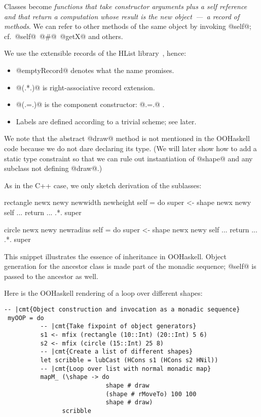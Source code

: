 Classes become \emph{functions that take constructor arguments plus a
self reference and that return a computation whose result is the new
object~---~a record of methods}. We can refer to other methods of the
same object by invoking @self@; cf.\ @self@~@#@~@getX@ and others.

We use the extensible records of the HList library~\cite{HLIST-HW04},
hence:
%
\begin{itemize}\noskip
\item @emptyRecord@ denotes what the name promises.
\item @(.*.)@ is right-associative record extension.
\item @(.=.)@ is the component constructor:  @.=.@ .
\item Labels are defined according to a trivial scheme; see later.
\end{itemize}

We note that the abstract @draw@ method is not mentioned in the
OOHaskell code because we do not dare declaring its type. (We will
later show how to add a static type constraint so that we can rule out
instantiation of @shape@ and any subclass not defining @draw@.)

As in the C++ case, we only sketch derivation of the sublasses:

\begin{code}
 rectangle newx newy newwidth newheight self
  = do  super <- shape newx newy self
        ...
        return ... .*. super
\end{code}

\begin{code}
 circle newx newy newradius self
  = do  super <- shape newx newy self
        ...
        return ... .*. super
\end{code}

This snippet illustrates the essence of inheritance in OOHaskell.
Object generation for the ancestor class is made part of the monadic
sequence; @self@ is passed to the ancestor as well.

Here is the OOHaskell rendering of a loop over different shapes:

\begin{Verbatim}[fontsize=\small,commandchars=\|\{\}]
 -- |cmt{Object construction and invocation as a monadic sequence}
 myOOP = do
          -- |cmt{Take fixpoint of object generators}
          s1 <- mfix (rectangle (10::Int) (20::Int) 5 6)
          s2 <- mfix (circle (15::Int) 25 8)
          -- |cmt{Create a list of different shapes}
          let scribble = lubCast (HCons s1 (HCons s2 HNil))
          -- |cmt{Loop over list with normal monadic map}
          mapM_ (\shape -> do
                            shape # draw
                            (shape # rMoveTo) 100 100
                            shape # draw)
                scribble
\end{Verbatim}

